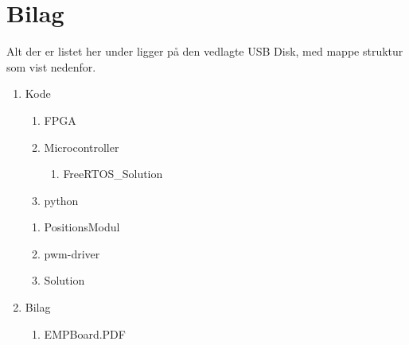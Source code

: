 \appendix
\section{Bilag} \hfill
Alt der er listet her under ligger på den vedlagte USB Disk, med mappe struktur som vist nedenfor.
\label{sec:bilag}
\begin{enumerate}[noitemsep]
	\item Kode
	\begin{enumerate}[noitemsep]
		\item FPGA
		\item Microcontroller
		\begin{enumerate}
			\item FreeRTOS_Solution
		\end{enumerate}
		\item python
	\end{enumerate}
	\begin{enumerate}
		\item PositionsModul
		\item pwm-driver
		\item Solution
	\end{enumerate}
	\item Bilag
	\begin{enumerate}[noitemsep]
		\item EMPBoard.PDF \label{itm:empboard}
	\end{enumerate}
\end{enumerate}
